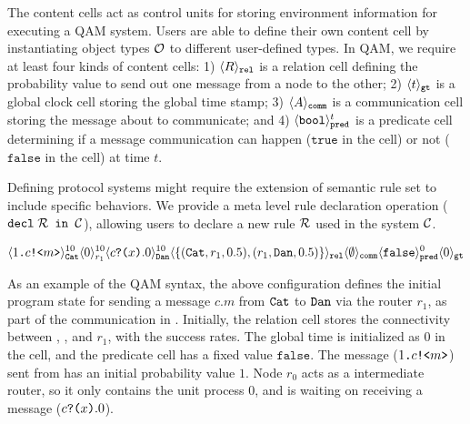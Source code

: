 The content cells act as control units for storing environment information for executing a QAM system.
Users are able to define their own content cell by instantiating object types $\mathcal{O}$ to different user-defined types.
In QAM, we require at least four kinds of content cells: 
1) $\langle R \rangle_{\texttt{rel}}$ is a relation cell defining the probability value to send out one message from a node to the other;
2) $\langle t \rangle_{\texttt{gt}}$ is a global clock cell storing the global time stamp;
3) $\langle A \rangle_{\texttt{comm}}$ is a communication cell storing the message about to communicate;
and 4) $\langle \texttt{bool} \rangle^{t}_{\texttt{pred}}$ is a predicate cell 
determining if a message communication can happen ($\texttt{true}$ in the cell) or not ($\texttt{false}$ in the cell) at time $t$.

Defining protocol systems might require the extension of semantic rule set to include specific behaviors.
We provide a meta level rule declaration operation ($\texttt{decl}\;\mathcal{R}\texttt{ in }\mathcal{C}$), allowing users to declare a new rule $\mathcal{R}$ used in the system $\mathcal{C}$. 

{\footnotesize
\[
\langle 1\texttt{.}c\texttt{!<}m\texttt{>} \rangle^{10}_{\texttt{Cat}}\langle 0 \rangle^{10}_{r_1}
\langle c\texttt{?(}x\texttt{)}.0 \rangle^{10}_{\texttt{Dan}} 
\langle \{(\texttt{Cat},r_1,0.5), (r_1,\texttt{Dan},0.5)\} \rangle_{\texttt{rel}}
\langle \emptyset \rangle_{\texttt{comm}}
\langle \texttt{false} \rangle^{0}_{\texttt{pred}}
\langle 0 \rangle_{\texttt{gt}}
\]
}

As an example of the QAM syntax, the above configuration defines the initial program state for sending a message $c.m$ from $\texttt{Cat}$ to $\texttt{Dan}$ via the router $r_1$, as part of the communication in . Initially, the relation cell stores the connectivity between , , and $r_1$, with the success rates. 
The global time is initialized as $0$ in the  cell, and the predicate cell has a fixed value $\texttt{false}$.
The message ($1\texttt{.}c\texttt{!<}m\texttt{>}$) sent from  has an initial probability value $1$.
Node $r_0$ acts as a intermediate router, so it only contains the unit process $0$, and  is waiting on receiving a message ($c\texttt{?(}x\texttt{)}.0$). 


